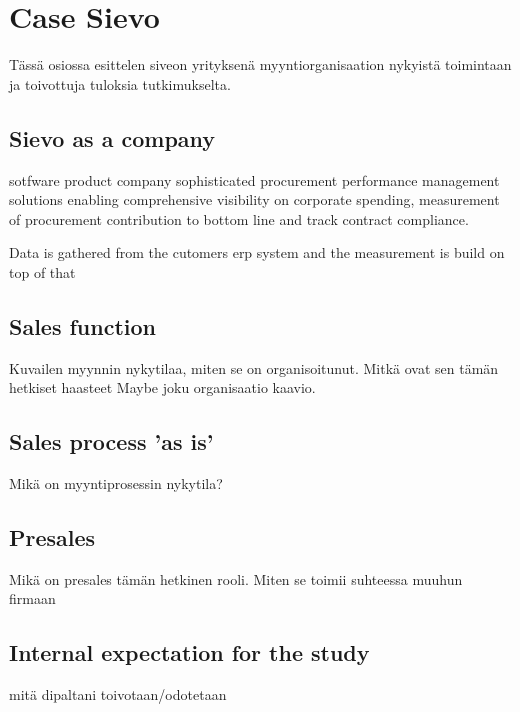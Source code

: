 \documentclass[12pt,a4paper,oneside,pdftex]{report}
\begin{document}
{{\begin{longtable}{@{}p{}p{}@{}}
\end{longtable}

% 

\chapter{Case Sievo}
\label{chapter:Case Sievo}

Tässä osiossa esittelen siveon yrityksenä myyntiorganisaation nykyistä toimintaan ja toivottuja tuloksia tutkimukselta.

\section{Sievo as a company}



sotfware product company
sophisticated procurement performance management solutions enabling comprehensive visibility on corporate spending, measurement of procurement contribution to bottom line and track contract compliance. 

Data is gathered from the cutomers erp system and the measurement is build on top of that 


\section{Sales function}

Kuvailen myynnin nykytilaa, miten se on organisoitunut. Mitkä ovat sen tämän hetkiset haasteet
Maybe joku organisaatio kaavio. 


\section{Sales process 'as is'}

Mikä on myyntiprosessin nykytila?

\section{Presales}

Mikä on presales tämän hetkinen rooli. Miten se toimii suhteessa muuhun firmaan

\section{Internal expectation for the study}

mitä dipaltani toivotaan/odotetaan

}}
\end{document}
